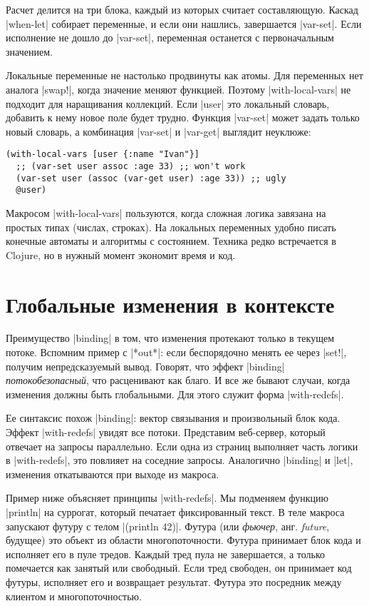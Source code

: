 Расчет делится на три блока, каждый из которых считает составляющую. Каскад
\spverb|when-let| собирает переменные, и если они нашлись, завершается
\spverb|var-set|. Если исполнение не дошло до \spverb|var-set|, переменная
останется с первоначальным значением.

Локальные переменные не настолько продвинуты как атомы. Для переменных нет
аналога \spverb|swap!|, когда значение меняют функцией. Поэтому
\spverb|with-local-vars| не подходит для наращивания коллекций. Если
\spverb|user| это локальный словарь, добавить к нему новое поле будет
трудно. Функция \spverb|var-set| может задать только новый словарь, а комбинация
\spverb|var-set| и \spverb|var-get| выглядит неуклюже:

\begin{verbatim}
(with-local-vars [user {:name "Ivan"}]
  ;; (var-set user assoc :age 33) ;; won't work
  (var-set user (assoc (var-get user) :age 33)) ;; ugly
  @user)
\end{verbatim}

Макросом \spverb|with-local-vars| пользуются, когда сложная логика завязана на
простых типах (числах, строках). На локальных переменных удобно писать конечные
автоматы и алгоритмы с состоянием. Техника редко встречается в Clojure, но в
нужный момент экономит время и код.

\section{Глобальные изменения в контексте}

Преимущество \spverb|binding| в том, что изменения протекают только в текущем
потоке. Вспомним пример с \spverb|*out*|: если беспорядочно менять ее через
\spverb|set!|, получим непредсказуемый вывод. Говорят, что эффект
\spverb|binding| \emph{потокобезопасный}, что расценивают как благо. И все же
бывают случаи, когда изменения должны быть глобальными. Для этого служит форма
\spverb|with-redefs|.

Ее синтаксис похож \spverb|binding|: вектор связывания и произвольный блок
кода. Эффект \spverb|with-redefs| увидят все потоки. Представим веб-сервер,
который отвечает на запросы параллельно. Если одна из страниц выполняет часть
логики в \spverb|with-redefs|, это повлияет на соседние запросы. Аналогично
\spverb|binding| и \spverb|let|, изменения откатываются при выходе из макроса.

Пример ниже объясняет принципы \spverb|with-redefs|. Мы подменяем функцию
\spverb|println| на суррогат, который печатает фиксированный текст. В теле
макроса запускают футуру с телом \spverb|(println 42)|. Футура (или
\emph{фьючер}, анг. \emph{future}, будущее) это объект из области
многопоточности. Футура принимает блок кода и исполняет его в пуле
тредов. Каждый тред пула не завершается, а только помечается как занятый или
свободный. Если тред свободен, он принимает код футуры, исполняет его и
возвращает результат. Футура это посредник между клиентом и многопоточностью.

